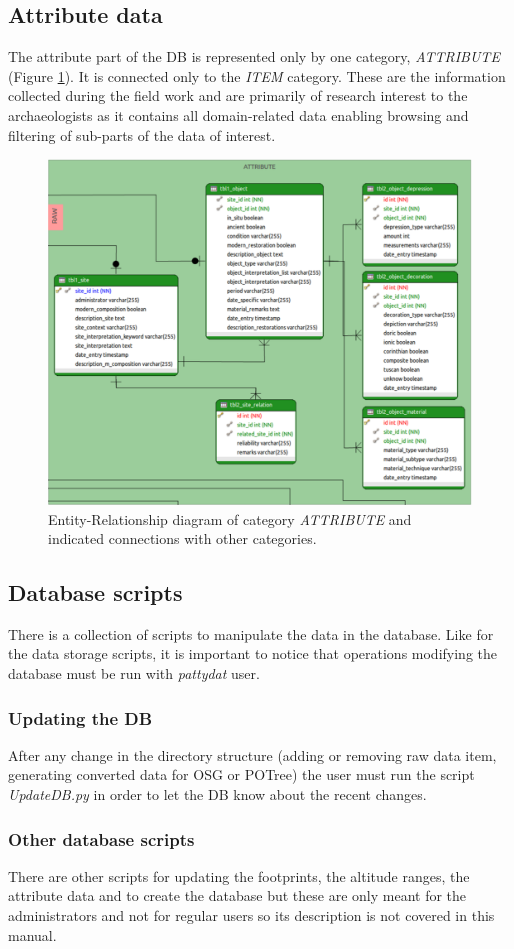 \subsection{Attribute data}
The attribute part of the DB is represented only by one category, {\em ATTRIBUTE}
(Figure \ref{fig:db_erdb_attribute}). It is connected only to the {\em ITEM} category.
These are the information collected during the field work and are primarily of research
interest to the archaeologists as it contains all domain-related data enabling browsing
and filtering of sub-parts of the data of interest.

\begin{figure}[H]
\centering
\includegraphics[scale=0.35]{fig/database/ERDB_ATTRIBUTE_conn.pdf}
\caption{Entity-Relationship diagram of category {\em ATTRIBUTE} and indicated
connections with other categories.}
\label{fig:db_erdb_attribute}
\end{figure}

\subsection{Database scripts}
\label{sec:dbscripts}
There is a collection of scripts to manipulate the data in the database. Like for the data storage scripts, it is important to notice that operations modifying the database must be run with \textit{pattydat} user.

\subsubsection{Updating the DB}
After any change in the directory structure (adding or removing raw data item, generating converted data for OSG or POTree) the user must run the script \textit{UpdateDB.py} in order to let the DB know about the recent changes.

\subsubsection{Other database scripts}
There are other scripts for updating the footprints, the altitude ranges, the attribute data and to create the database but these are only meant for the administrators and not for regular users so its description is not covered in this manual.